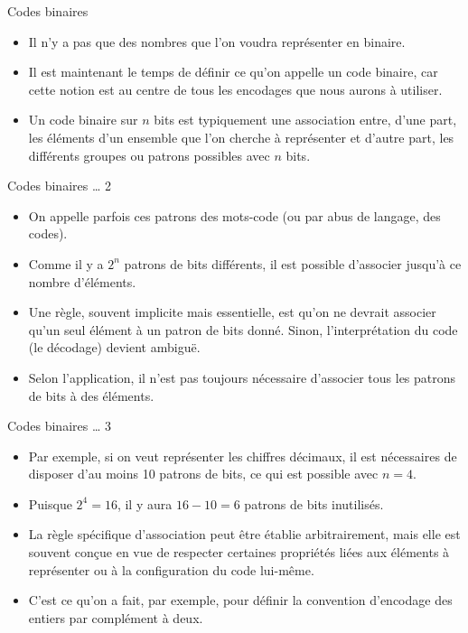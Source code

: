 \documentclass[presentation]{beamer}
\begin{document}
\begin{frame}[label={sec:org92baaf5}]{Codes binaires}
\begin{itemize}
\item Il n'y a pas que des nombres que l'on voudra représenter en binaire.

\item Il est maintenant le temps de définir ce qu'on appelle un \alert{code binaire}, car cette notion est au centre de tous les encodages que nous aurons à utiliser.

\item Un code binaire sur \(n\) bits est typiquement une association entre, d'une part, les éléments d'un ensemble que l'on cherche à représenter et d’autre part, les différents groupes ou patrons possibles avec \(n\) bits.
\end{itemize}
\end{frame}

\begin{frame}[label={sec:org89edc83}]{Codes binaires \ldots{} 2}
\begin{itemize}
\item On appelle parfois ces patrons des mots-code (ou par abus de langage, des codes).

\item Comme il y a \(2^n\) patrons de bits différents, il est possible d'associer jusqu'à ce nombre d'éléments.

\item Une règle, souvent implicite mais essentielle, est qu'\alert{on ne devrait associer qu'un seul élément à un patron de bits donné.} Sinon, l'interprétation du code (le décodage) devient ambiguë.

\item Selon l'application, il n'est pas toujours nécessaire d'associer tous les patrons de bits à des éléments.
\end{itemize}
\end{frame}

\begin{frame}[label={sec:orgdeb7e8b}]{Codes binaires \ldots{} 3}
\begin{itemize}
\item Par exemple, si on veut représenter les chiffres décimaux, il est nécessaires de disposer d'au moins 10 patrons de bits, ce qui est possible avec \(n=4\).

\item Puisque \(2^4 = 16\), il y aura \(16 - 10 = 6\) patrons de bits inutilisés.

\item La règle spécifique d'association peut être établie arbitrairement, mais elle est souvent conçue en vue de respecter certaines propriétés liées aux éléments à représenter ou à la configuration du code lui-même.

\item C'est ce qu'on a fait, par exemple, pour définir la convention d'encodage des entiers par complément à deux.
\end{itemize}
\end{frame}
\end{document}
